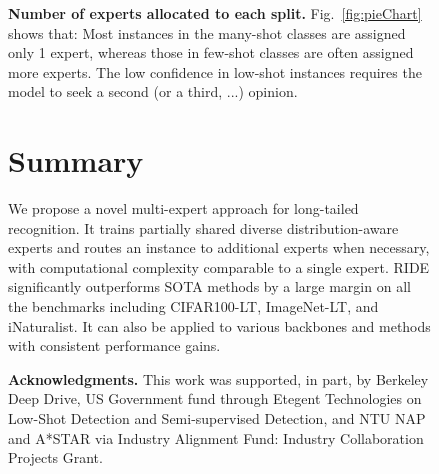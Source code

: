 \documentclass[dvipsnames]{article}
\def\fig#1{Fig.~\ref{fig:#1}}
\begin{document}
{\begin{figure}[#1]
{\bf{Number of experts allocated to each split.}} \fig{pieChart} shows that: 
Most instances in the many-shot classes are assigned only 1 expert, whereas those in few-shot classes are often assigned more experts.  The low confidence in low-shot instances requires the model to seek a second (or a third, ...) opinion.

 \section{Summary}

We propose a novel multi-expert approach for long-tailed recognition.  It trains partially shared diverse distribution-aware experts and routes an instance to additional experts when necessary, with computational complexity comparable to a single expert. RIDE significantly outperforms SOTA methods by a large margin on all the benchmarks including CIFAR100-LT, ImageNet-LT, and iNaturalist. It can also be applied to various backbones and methods with consistent performance gains.  

{\bf Acknowledgments.}
This work was supported, in part, by Berkeley Deep Drive, US Government fund through Etegent Technologies on Low-Shot Detection and Semi-supervised Detection, and NTU NAP and A*STAR via  Industry Alignment Fund: Industry Collaboration Projects Grant.

\clearpage




\end{figure}}
\end{document}
